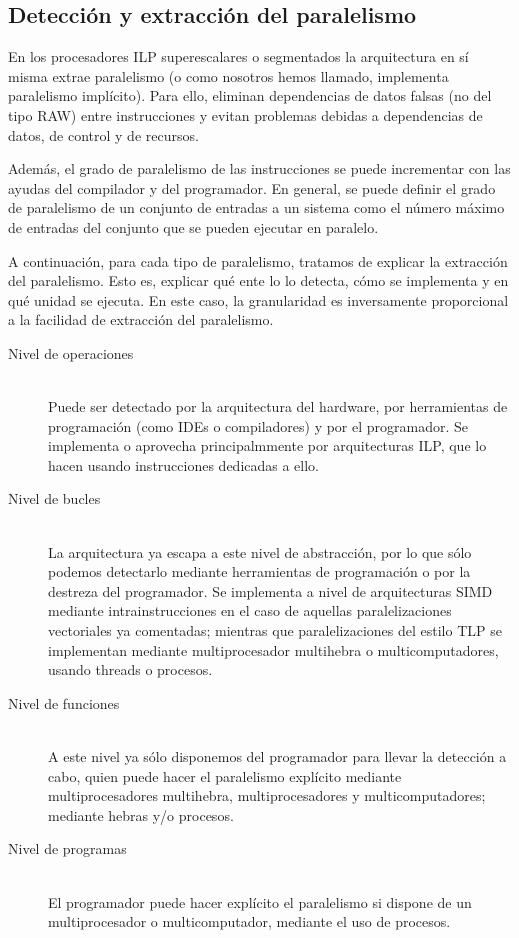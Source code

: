\subsection{Detección y extracción del paralelismo}
En los procesadores ILP superescalares o segmentados la arquitectura en sí misma extrae paralelismo (o como nosotros hemos llamado, implementa paralelismo implícito). Para ello, eliminan dependencias de datos falsas (no del tipo RAW) entre instrucciones y evitan problemas debidas a dependencias de datos, de control y de recursos.

Además, el grado de paralelismo de las instrucciones se puede incrementar con las ayudas del compilador y del programador. En general, se puede definir el grado de paralelismo de un conjunto de entradas a un sistema como el número máximo de entradas del conjunto que se pueden ejecutar en paralelo. 

A continuación, para cada tipo de paralelismo, tratamos de explicar la extracción del paralelismo. Esto es, explicar qué ente lo lo detecta, cómo se implementa y en qué unidad se ejecuta. En este caso, la granularidad es inversamente proporcional a la facilidad de extracción del paralelismo.
\begin{description}
    \item [Nivel de operaciones]~\\
        Puede ser detectado por la arquitectura del hardware, por herramientas de programación (como IDEs o compiladores) y por el programador. Se implementa o aprovecha principalmmente por arquitecturas ILP, que lo hacen usando instrucciones dedicadas a ello.
    \item [Nivel de bucles]~\\
        La arquitectura ya escapa a este nivel de abstracción, por lo que sólo podemos detectarlo mediante herramientas de programación o por la destreza del programador. Se implementa a nivel de arquitecturas SIMD mediante intrainstrucciones en el caso de aquellas paralelizaciones vectoriales ya comentadas; mientras que paralelizaciones del estilo TLP se implementan mediante multiprocesador multihebra o multicomputadores, usando threads o procesos.
    \item [Nivel de funciones]~\\
        A este nivel ya sólo disponemos del programador para llevar la detección a cabo, quien puede hacer el paralelismo explícito mediante multiprocesadores multihebra, multiprocesadores y multicomputadores; mediante hebras y/o procesos.
    \item [Nivel de programas]~\\
        El programador puede hacer explícito el paralelismo si dispone de un multiprocesador o multicomputador, mediante el uso de procesos.
\end{description}

